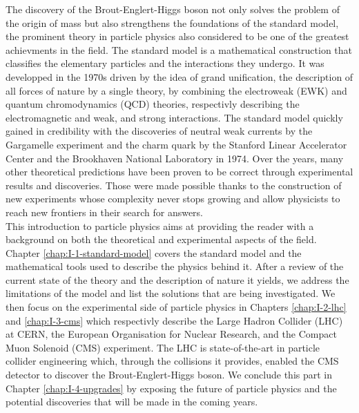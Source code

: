 The discovery of the Brout-Englert-Higgs boson not only solves the problem of the origin of mass but also strengthens the foundations of the standard model, the prominent theory in particle physics also considered to be one of the greatest achievments in the field. The standard model is a mathematical construction that classifies the elementary particles and the interactions they undergo. It was developped in the 1970s driven by the idea of grand unification, the description of all forces of nature by a single theory, by combining the electroweak (EWK) and quantum chromodynamics (QCD) theories, respectivly describing the electromagnetic and weak, and strong interactions. The standard model quickly gained in credibility with the discoveries of neutral weak currents by the Gargamelle experiment and the charm quark by the Stanford Linear Accelerator Center and the Brookhaven National Laboratory in 1974. Over the years, many other theoretical predictions have been proven to be correct through experimental results and discoveries. Those were made possible thanks to the construction of new experiments whose complexity never stops growing and allow physicists to reach new frontiers in their search for answers. \\

This introduction to particle physics aims at providing the reader with a background on both the theoretical and experimental aspects of the field. Chapter \ref{chap:I-1-standard-model} covers the standard model and the mathematical tools used to describe the physics behind it. After a review of the current state of the theory and the description of nature it yields, we address the limitations of the model and list the solutions that are being investigated. We then focus on the experimental side of particle physics in Chapters \ref{chap:I-2-lhc} and \ref{chap:I-3-cms} which respectivly describe the Large Hadron Collider (LHC) at CERN, the European Organisation for Nuclear Research, and the Compact Muon Solenoid (CMS) experiment. The LHC is state-of-the-art in particle collider engineering which, through the collisions it provides, enabled the CMS detector to discover the Brout-Englert-Higgs boson. We conclude this part in Chapter \ref{chap:I-4-upgrades} by exposing the future of particle physics and the potential discoveries that will be made in the coming years.
